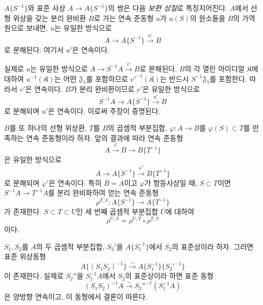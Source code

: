 \begin{env}[7.6.6]
\label{0.7.6.6-ko}
$A\{S^{-1}\}$와 표준 사상 $A\to A\{S^{-1}\}$의 쌍은 다음
\emph{보편 성질}로 특징지어진다. $A$에서 선형 위상을 갖는 분리
완비환 $B$로 가는 연속 준동형 $u$가 $u(S)$의 원소들을 $B$의
가역원으로 보내면, $u$는 유일한 방식으로
\[
  A\longrightarrow A\{S^{-1}\}\xrightarrow{u'}B
\]
로 분해된다. 여기서 $u'$은 연속이다.

실제로 $u$는 유일한 방식으로
$A\to S^{-1}A\xrightarrow{v'}B$로 분해된다. $B$의 각 열린
아이디얼 $\mathfrak K$에 대하여 $u^{-1}(\mathfrak K)$는 어떤
$\mathfrak J_\lambda$를 포함하므로
${v'}^{-1}(\mathfrak K)$는 반드시
$S^{-1}\mathfrak J_\lambda$를 포함한다. 따라서 $v'$은 연속이다.
$B$가 분리 완비환이므로 $v'$은 유일한 방식으로
\[
  S^{-1}A\longrightarrow A\{S^{-1}\}\xrightarrow{u'}B
\]
로 분해되며 $u'$은 연속이다. 이로써 주장이 증명된다.
\end{env}

\begin{env}[7.6.7]
\label{0.7.6.7-ko}
$B$를 또 하나의 선형 위상환, $T$를 $B$의 곱셈적 부분집합,
$\varphi:A\to B$를 $\varphi(S)\subset T$를 만족하는 연속
준동형이라 하자. 앞의 결과에 따라 연속 준동형
\[
  A\xrightarrow{\varphi}B\longrightarrow B\{T^{-1}\}
\]
은 유일한 방식으로
\[
  A\longrightarrow A\{S^{-1}\}
  \xrightarrow{\varphi'}B\{T^{-1}\}
\]
로 분해되며 $\varphi'$은 연속이다. 특히 $B=A$이고 $\varphi$가
항등사상일 때, $S\subset T$이면
$S^{-1}A\to T^{-1}A$를 분리 완비화하여 얻는 연속 준동형
\[
  \rho^{T,S}:A\{S^{-1}\}\longrightarrow A\{T^{-1}\}
\]
가 존재한다. $S\subset T\subset U$인 세 번째 곱셈적 부분집합
$U$에 대하여
\[
  \rho^{U,S}=\rho^{U,T}\circ\rho^{T,S}
\]
이다.
\end{env}

\begin{env}[7.6.8]
\label{0.7.6.8-ko}
$S_1,S_2$를 $A$의 두 곱셈적 부분집합, $S_2'$을
$A\{S_1^{-1}\}$에서 $S_2$의 표준상이라 하자. 그러면 표준
위상동형
\[
  A\{(S_1S_2)^{-1}\}
  \xrightarrow{\sim}
  A\{S_1^{-1}\}\{{S_2'}^{-1}\}
\]
이 존재한다. 실제로 $S_2''$을 $S_1^{-1}A$에서 $S_2$의 표준상이라
하면 표준 동형
\[
  (S_1S_2)^{-1}A\xrightarrow{\sim}{S_2''}^{-1}(S_1^{-1}A)
\]
은 양방향 연속이고, 이 동형에서 결론이 따른다.
\end{env}

